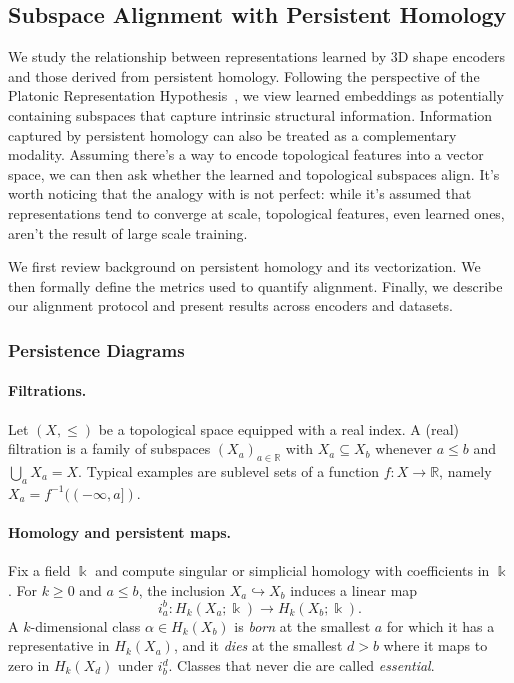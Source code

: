 \subsection{Subspace Alignment with Persistent Homology}
\label{ssec:ph}

We study the relationship between representations learned by 3D shape encoders and those derived from persistent homology. Following the perspective of the Platonic Representation Hypothesis~\cite{plato,platonic}, we view learned embeddings as potentially containing subspaces that capture intrinsic structural information. Information captured by persistent homology can also be treated as a complementary modality. Assuming there's a way to encode topological features into a vector space, we can then ask whether the learned and topological subspaces align. It's worth noticing that the analogy with \cite{platonic} is not perfect: while it's assumed that representations tend to converge at scale, topological features, even learned ones, aren't the result of large scale training.

We first review background on persistent homology and its vectorization. We then formally define the metrics used to quantify alignment. Finally, we describe our alignment protocol and present results across encoders and datasets.


\subsubsection{Persistence Diagrams}
\label{sssec:persistence_diagrams}


\paragraph{Filtrations.}
Let $(X, \leq)$ be a topological space equipped with a real index. A (real) filtration is a family of subspaces $(X_a)_{a\in\mathbb{R}}$ with $X_a \subseteq X_b$ whenever $a \leq b$ and $\bigcup_a X_a = X$. Typical examples are sublevel sets of a function $f:X\to\mathbb{R}$, namely $X_a = f^{-1}((-\infty,a])$.

\paragraph{Homology and persistent maps.}
Fix a field $\Bbbk$ and compute singular or simplicial homology with coefficients in $\Bbbk$. For $k\ge 0$ and $a\le b$, the inclusion $X_a \hookrightarrow X_b$ induces a linear map
\begin{equation}
i_{a}^{b}: H_k(X_a;\Bbbk) \longrightarrow H_k(X_b;\Bbbk).
\end{equation}
A $k$-dimensional class $\alpha\in H_k(X_b)$ is \emph{born} at the smallest $a$ for which it has a representative in $H_k(X_a)$, and it \emph{dies} at the smallest $d>b$ where it maps to zero in $H_k(X_d)$ under $i_{b}^{d}$. Classes that never die are called \emph{essential}.

